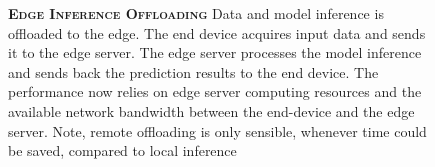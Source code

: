 \begin{figure}
	\begin{minipage}{0.3\linewidth}
		\centering
		\begin{figure}
			\centering
			\captionsetup[subfigure]{justification=centering}
		\end{figure}
	\end{minipage}
	\hfill
	\begin{minipage}{0.65\linewidth}
		\textbf{\protect{} \textsc{Edge Inference Offloading}}
		\color{caption-color} \newline
		Data and model inference is offloaded to the edge. The end device acquires input data and sends it to the edge server. The edge server processes the model inference and sends back the prediction results to the end device. The performance now relies on edge server computing resources and the available network bandwidth between the end-device and the edge server. Note, remote offloading is only sensible, whenever time could be saved, compared to local inference	\end{minipage}
\end{figure}


